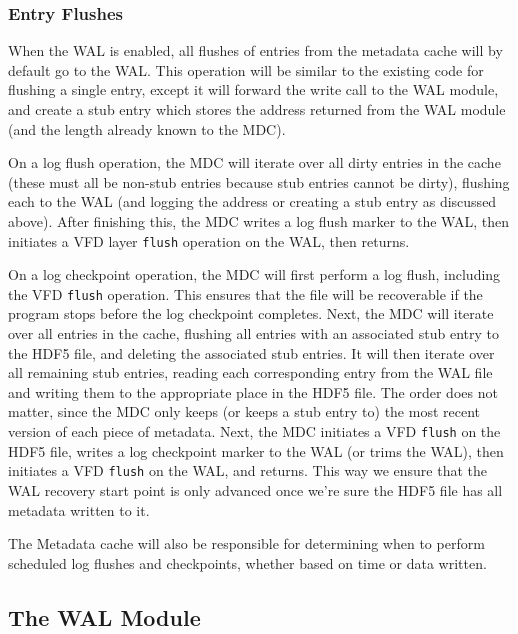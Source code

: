 \subsubsection{Entry Flushes}

When the WAL is enabled, all flushes of entries from the metadata cache will by default go to the WAL. This operation will be similar to the existing code for flushing a single entry, except it will forward the write call to the WAL module, and create a stub entry which stores the address returned from the WAL module (and the length already known to the MDC).

On a log flush operation, the MDC will iterate over all dirty entries in the cache (these must all be non-stub entries because stub entries cannot be dirty), flushing each to the WAL (and logging the address or creating a stub entry as discussed above). After finishing this, the MDC writes a log flush marker to the WAL, then initiates a VFD layer \texttt{flush} operation on the WAL, then returns.

On a log checkpoint operation, the MDC will first perform a log flush, including the VFD \texttt{flush} operation. This ensures that the file will be recoverable if the program stops before the log checkpoint completes. Next, the MDC will iterate over all entries in the cache, flushing all entries with an associated stub entry to the HDF5 file, and deleting the associated stub entries. It will then iterate over all remaining stub entries, reading each corresponding entry from the WAL file and writing them to the appropriate place in the HDF5 file. The order does not matter, since the MDC only keeps (or keeps a stub entry to) the most recent version of each piece of metadata. Next, the MDC initiates a VFD \texttt{flush} on the HDF5 file, writes a log checkpoint marker to the WAL (or trims the WAL), then initiates a VFD \texttt{flush} on the WAL, and returns. This way we ensure that the WAL recovery start point is only advanced once we're sure the HDF5 file has all metadata written to it.

The Metadata cache will also be responsible for determining when to perform scheduled log flushes and checkpoints, whether based on time or data written.


\subsection{The WAL Module}

